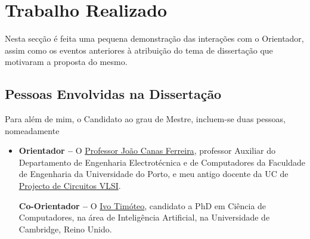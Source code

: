 \documentclass[a4paper, onecolumn, 10pt]{article}
\begin{document}
\section{Trabalho Realizado}
Nesta secção é feita uma pequena demonstração das interações com o Orientador, assim como os eventos anteriores à atribuição do tema de dissertação que motivaram a proposta do mesmo.

	\subsection{Pessoas Envolvidas na Dissertação}
	Para além de mim, o Candidato ao grau de Mestre, incluem-se duas pessoas, nomeadamente

	\begin{itemize}
		\item
			\textbf{Orientador --} O \href{https://sigarra.up.pt/feup/pt/func_geral.formview?p_codigo=210963}{Professor João Canas Ferreira}, professor Auxiliar do Departamento de Engenharia Electrotécnica e de Computadores da Faculdade de Engenharia da Universidade do Porto, e meu antigo docente da UC de \href{https://sigarra.up.pt/feup/pt/UCURR_GERAL.FICHA_UC_VIEW?pv_ocorrencia_id=352359}{Projecto de Circuitos VLSI}.

			\textbf{Co-Orientador --} O \href{http://www.cl.cam.ac.uk/~ijpdmt2/}{Ivo Timóteo}, candidato a PhD em Ciência de Computadores, na área de Inteligência Artificial, na Universidade de Cambridge, Reino Unido.
	
	\end{itemize}	
\end{document}
